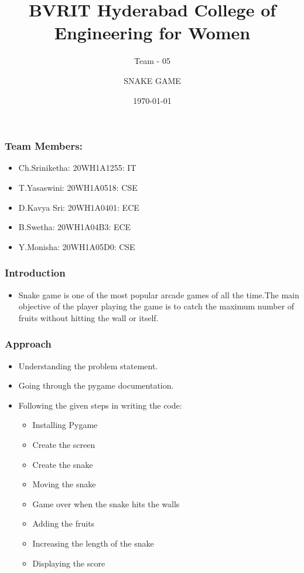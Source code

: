 \documentclass[14pt]{beamer}
\title{BVRIT Hyderabad College of Engineering for Women}
\subtitle {Team - 05}
\date{\today}
\author[Bvrith]{SNAKE GAME}
\begin{document}
    \begin{frame}
        \titlepage
    \end{frame}
\begin{frame}
	\frametitle{Team Members:}
        \begin{itemize}
	 \item Ch.Sriniketha: 20WH1A1255: IT 
	\item  T.Yasaswini: 20WH1A0518: CSE
	 \item  D.Kavya Sri: 20WH1A0401: ECE 
	\item B.Swetha: 20WH1A04B3: ECE
	\item Y.Monisha: 20WH1A05D0: CSE
\end{itemize}
    \end{frame}

    \begin{frame}
	\frametitle{Introduction}
        \begin{itemize}
	    \item Snake game is one of the most popular arcade games of all the time.The main objective of the player playing the game is to catch the maximum number of fruits without hitting the wall or itself.
	\end{itemize}
    \end{frame}

    \begin{frame}
	\frametitle{Approach}
	\begin{itemize}
	   \item Understanding the problem statement.
	   \item Going through the pygame documentation. 
	    \item Following the given steps in writing the code:
	    \begin{itemize}	 
             \item  Installing Pygame
             \item Create the screen
             \item Create the snake
             \item Moving the snake
             \item Game over when the snake hits the walls
             \item Adding the fruits
             \item Increasing the length of the snake
             \item Displaying the score
	\end{itemize}
	\end{itemize}    
	\end{frame}
\end{document}
